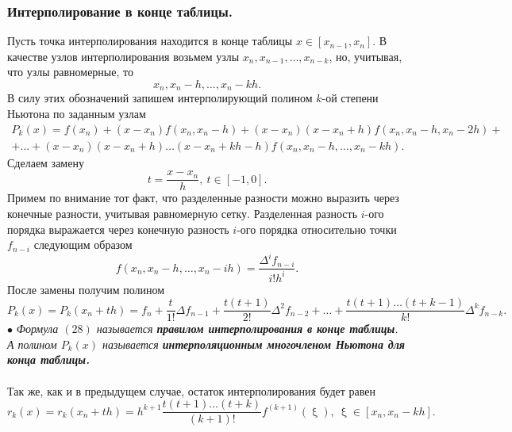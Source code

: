 \documentclass[a4paper, 12pt]{report}
\numberwithin{equation}{section}
\renewcommand{\xi}{\upxi}
\begin{document}
	\subsubsection{Интерполирование в конце таблицы.}
	Пусть точка интерполирования находится в конце таблицы $x\in[x_{n-1}, x_n]$. В качестве узлов интерполирования возьмем узлы $x_n, x_{n-1}, \ldots, x_{n-k}$, но, учитывая, что узлы равномерные, то $$x_n, x_n-h,\ldots, x_n-kh.$$
	В силу этих обозначений запишем интерполирующий полином $k$-ой степени Ньютона по заданным узлам \begin{multline*}
		P_k(x) = f(x_n) + (x-x_n)f(x_n, x_n-h) + (x-x_n)(x - x_n + h)f(x_n, x_n - h, x_n-2h) +\\+ \ldots + (x-x_n)(x-x_n + h)\ldots (x-x_n + kh - h)f(x_n, x_n -h,\ldots, x_n-kh).
	\end{multline*}
	Сделаем замену $$t = \dfrac{x-x_n}{h},\ t\in [-1, 0].$$
	Примем по внимание тот факт, что разделенные разности можно выразить через конечные разности, учитывая равномерную сетку. Разделенная разность $i$-ого порядка выражается через конечную разность $i$-ого порядка относительно точки $f_{n-i}$ следующим образом $$f(x_n, x_n-h,\ldots, x_n - ih) = \dfrac{\Delta^i f_{n-i}}{i! h^i}.$$
	После замены получим полином \begin{equation}
		P_k(x) = P_k(x_n + th) = f_n + \dfrac{t}{1!}\Delta f_{n-1} + \dfrac{t(t+1)}{2!}\Delta^2f_{n-2} + \ldots + \dfrac{t(t+1)\ldots (t+k-1)}{k!}\Delta^k f_{n-k}.
	\end{equation}
	$\bullet$ \textit{Формула $(28)$ называется \textbf{правилом интерполирования в конце таблицы}. А полином $P_k(x)$ называется \textbf{интерполяционным многочленом Ньютона для конца таблицы.}}\\\\
	Так же, как и в предыдущем случае, остаток интерполирования будет равен 
	\begin{equation}
		r_k(x) = r_k(x_n + th) = h^{k+1}\dfrac{t(t+1)\ldots (t+k)}{(k+1)!}f^{(k+1)}(\xi),\ \xi \in [x_n, x_{n}-kh].
	\end{equation}
\end{document}
